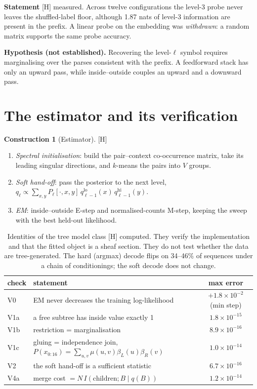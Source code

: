 \documentclass[11pt]{article}
\theoremstyle{definition}
\newtheorem{construction}[theorem]{Construction}
\theoremstyle{remark}
\newcommand{\src}[1]{\textsf{\small[#1]}}
\newcommand{\st}[1]{\textsf{\small\color{gray}#1}}
\begin{document}
\noindent\textbf{Statement} \src{H} \st{measured}. Across twelve configurations the level-3 probe never leaves the shuffled-label floor, although 1.87 nats of level-3 information are present in the prefix. A linear probe on the embedding was \emph{withdrawn}: a random matrix supports the same probe accuracy.

\noindent\textbf{Hypothesis (not established).} Recovering the level-$\ell$ symbol requires marginalising over the parses consistent with the prefix. A feedforward stack has only an upward pass, while inside--outside couples an upward and a downward pass.

\section{The estimator and its verification}
\begin{construction}[Estimator]\src{H}
\begin{enumerate}
  \item \emph{Spectral initialisation}: build the pair--context co-occurrence matrix, take its leading singular directions, and $k$-means the pairs into $V$ groups.
  \item \emph{Soft hand-off}: pass the posterior to the next level, $q_\ell\propto\sum_{x,y}P_\ell[\cdot,x,y]\,q^{\text{lo}}_{\ell-1}(x)\,q^{\text{hi}}_{\ell-1}(y)$.
  \item \emph{EM}: inside--outside E-step and normalised-counts M-step, keeping the sweep with the best held-out likelihood.
\end{enumerate}
\end{construction}

\begin{table}[h]\centering\small
\begin{tabular}{llc}
\toprule
check & statement & max error\\
\midrule
V0 & EM never decreases the training log-likelihood & $+1.8\times10^{-2}$ (min step)\\
V1a & a free subtree has inside value exactly 1 & $1.8\times10^{-15}$\\
V1b & restriction = marginalisation & $8.9\times10^{-16}$\\
V1c & gluing = independence join, $P(x_{0:16})=\sum_{u,v}\mu(u,v)\beta_L(u)\beta_R(v)$ & $1.0\times10^{-14}$\\
V2 & the soft hand-off is a sufficient statistic & $6.7\times10^{-16}$\\
V4a & merge cost $=N\,I(\text{children};B\mid q(B))$ & $1.2\times10^{-14}$\\
\bottomrule
\end{tabular}
\caption{Identities of the tree model class \src{H} \st{computed}. They verify the implementation and that the fitted object is a sheaf section. They do not test whether the data are tree-generated. The hard (argmax) decode flips on 34--46\% of sequences under a chain of conditionings; the soft decode does not change.}
\end{table}
\end{document}
